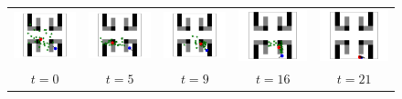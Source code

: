 \documentclass[letterpaper]{article} %
\begin{document}
\begin{figure}[!htb]
	\centering
	\begin{tabular}{ccccc}
		\includegraphics[width=0.18\linewidth]{figs/130/0.pdf} &
		\includegraphics[width=0.18\linewidth]{figs/130/5.pdf} &
		\includegraphics[width=0.18\linewidth]{figs/130/9.pdf} &
		\includegraphics[width=0.18\linewidth]{figs/130/16.pdf} &
		\includegraphics[width=0.18\linewidth]{figs/130/21.pdf} \\
		$t=0$ & $t=5$ & $t=9$ & $t=16$ & $t=21$
	\end{tabular}
\end{figure}
\end{document}
